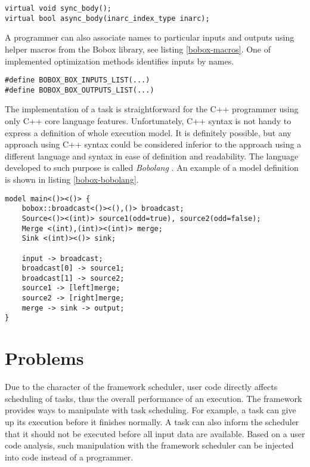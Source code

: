 \begin{lstlisting}[caption={The code representation of the box action step.},label={bobox-action-step}]
virtual void sync_body();
virtual bool async_body(inarc_index_type inarc);
\end{lstlisting}

A programmer can also associate names to particular inputs and outputs using helper macros from the Bobox library, see listing \ref{bobox-macros}. One of implemented optimization methods identifies inputs by names.

\begin{lstlisting}[caption={Helper macros for mapping of names to inputs and outputs.},label={bobox-macros}]
#define BOBOX_BOX_INPUTS_LIST(...)
#define BOBOX_BOX_OUTPUTS_LIST(...)
\end{lstlisting}

The implementation of a task is straightforward for the C++ programmer using only C++ core language features. Unfortunately, C++ syntax is not handy to express a definition of whole execution model. It is definitely possible, but any approach using C++ syntax could be considered inferior to the approach using a different language and syntax in ease of definition and readability. The language developed to such purpose is called \emph{Bobolang} \cite{bobolang}. An example of a model definition is shown in listing \ref{bobox-bobolang}.

\begin{lstlisting}[caption={An example of the Bobolang usage.}, label={bobox-bobolang}]
model main<()><()> {
	bobox::broadcast<()><(),()> broadcast;
	Source<()><(int)> source1(odd=true), source2(odd=false);
	Merge <(int),(int)><(int)> merge;
	Sink <(int)><()> sink;
	
	input -> broadcast;
	broadcast[0] -> source1;
	broadcast[1] -> source2;
	source1 -> [left]merge;
	source2 -> [right]merge;
	merge -> sink -> output;
}
\end{lstlisting}

\section{Problems}
Due to the character of the framework scheduler, user code directly affects scheduling of tasks, thus the overall performance of an execution. The framework provides ways to manipulate with task scheduling. For example, a task can give up its execution before it finishes normally. A task can also inform the scheduler that it should not be executed before all input data are available. Based on a user code analysis, such manipulation with the framework scheduler can be injected into code instead of a programmer.
